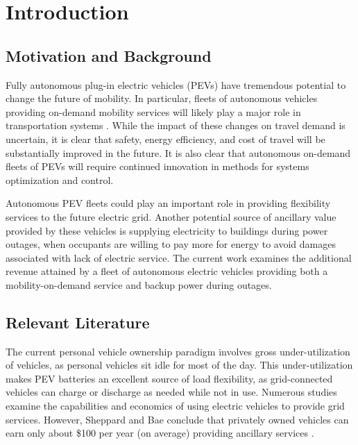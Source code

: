 \documentclass[journal]{IEEEtran}
\begin{document}
%
\IEEEpeerreviewmaketitle

\section{Introduction}

\subsection{Motivation and Background}
Fully autonomous plug-in electric vehicles (PEVs) have tremendous potential to change the future of mobility. In particular, fleets of autonomous vehicles providing on-demand mobility services will likely play a major role in transportation systems \cite{litman_2015}. While the impact of these changes on travel demand is uncertain, it is clear that safety, energy efficiency, and cost of travel will be substantially improved in the future. It is also clear that autonomous on-demand fleets of PEVs will require continued innovation in methods for systems optimization and control.

Autonomous PEV fleets could play an important role in providing flexibility services to the future electric grid. Another potential source of ancillary value provided by these vehicles is supplying electricity to buildings during power outages, when occupants are willing to pay more for energy to avoid damages associated with lack of electric service. The current work examines the additional revenue attained by a fleet of autonomous electric vehicles providing both a mobility-on-demand service and backup power during outages.

\subsection{Relevant Literature}
The current personal vehicle ownership paradigm involves gross under-utilization of vehicles, as personal vehicles sit idle for most of the day. This under-utilization makes PEV batteries an excellent source of load flexibility, as grid-connected vehicles can charge or discharge as needed while not in use. Numerous studies examine the capabilities \cite{lefloch_pde_2016, lefloch_pde_2015, ota_autonomous_v2g, behrouz_2014} and economics \cite{cpuc_2016, sheppard_bae_2015, ota_autonomous_v2g} of using electric vehicles to provide grid services. However, Sheppard and Bae conclude that privately owned vehicles can earn only about \$100 per year (on average) providing ancillary services \cite{sheppard_bae_2015}. 
\end{document}
